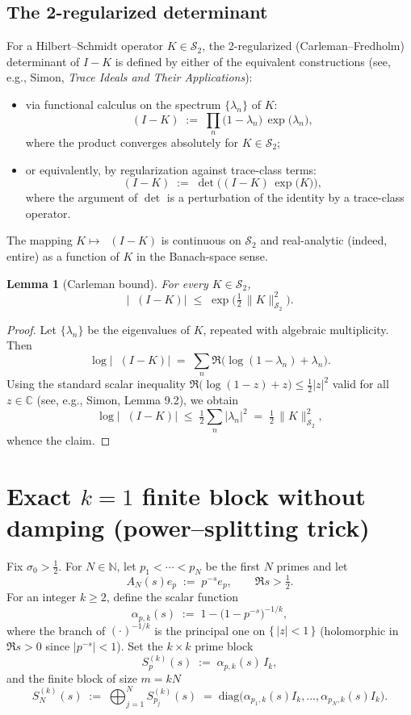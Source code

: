 \documentclass[11pt]{article}
\newtheorem{lemma}[theorem]{Lemma}
\theoremstyle{definition}
\theoremstyle{remark}
\newcommand{\C}{\mathbb{C}}
\newcommand{\HS}{\mathcal{S}_2}
\DeclareMathOperator{\dettwo}{det_2}
\begin{document}
\subsection{The 2-regularized determinant \(\dettwo\)}
For a Hilbert--Schmidt operator \(K\in\HS\), the 2-regularized (Carleman--Fredholm) determinant of \(I-K\) is defined by either of the equivalent constructions (see, e.g., Simon, \emph{Trace Ideals and Their Applications}):
\begin{itemize}
 \item via functional calculus on the spectrum \(\{\lambda_n\}\) of \(K\):
 \[
  \dettwo(I-K)\;:=\;\prod_{n}\big(1-\lambda_n\big)\,\exp\!\big(\lambda_n\big),
 \]
 where the product converges absolutely for \(K\in\HS\);
 \item or equivalently, by regularization against trace-class terms:
 \[
  \dettwo(I-K)\;:=\;\det\!\Big((I-K)\,\exp\big(K\big)\Big),
 \]
 where the argument of \(\det\) is a perturbation of the identity by a trace-class operator.
\end{itemize}
The mapping \(K\mapsto \dettwo(I-K)\) is continuous on \(\HS\) and real-analytic (indeed, entire) as a function of \(K\) in the Banach-space sense.

\begin{lemma}[Carleman bound]\label{lem:carleman}
For every \(K\in\HS\),
\[
 \big|\dettwo(I-K)\big|\;\le\; \exp\!\Big(\tfrac12\,\|K\|_{\HS}^2\Big).
\]
\end{lemma}
\begin{proof}
Let \(\{\lambda_n\}\) be the eigenvalues of \(K\), repeated with algebraic multiplicity. Then
\[
 \log\big|\dettwo(I-K)\big|\;=\; \sum_n \Re\Big(\log(1-\lambda_n)+\lambda_n\Big).
\]
Using the standard scalar inequality \(\Re\big(\log(1-z)+z\big)\le \tfrac12 |z|^2\) valid for all \(z\in\C\) (see, e.g., Simon, Lemma 9.2), we obtain
\[
 \log\big|\dettwo(I-K)\big|\;\le\; \tfrac12\sum_n |\lambda_n|^2\;=\;\tfrac12\,\|K\|_{\HS}^2,
\]
whence the claim.
\end{proof}

\section*{Exact $k=1$ finite block without damping (power--splitting trick)}

Fix $\sigma_0>\tfrac12$. For $N\in\mathbb N$, let $p_1<\cdots<p_N$ be the first $N$ primes and let
\[
 A_N(s)e_p\;:=\;p^{-s}e_p,\qquad \Re s>\tfrac12.
\]
For an integer $k\ge 2$, define the scalar function
\[
 \alpha_{p,k}(s)\;:=\;1-\bigl(1-p^{-s}\bigr)^{-1/k},
\]
where the branch of $(\cdot)^{-1/k}$ is the principal one on $\{\,|z|<1\,\}$ (holomorphic in $\Re s>0$ since $|p^{-s}|<1$). Set the $k\times k$ prime block
\[
 S_p^{(k)}(s)\;:=\;\alpha_{p,k}(s)\,I_k,
\]
and the finite block of size $m=kN$
\[
 \boxed{\quad S_{N}^{(k)}(s)\;:=\;\bigoplus_{j=1}^{N} S_{p_j}^{(k)}(s)\;=\;\mathrm{diag}\bigl(\alpha_{p_1,k}(s)I_k,\dots,\alpha_{p_N,k}(s)I_k\bigr).\quad}
\]
\end{document}
